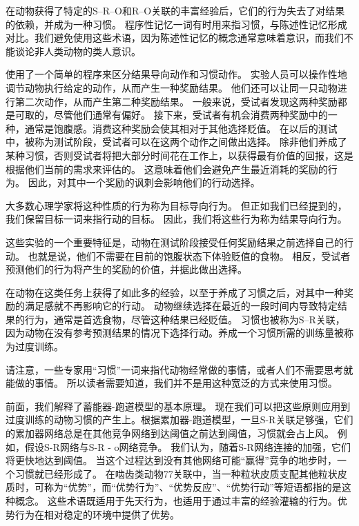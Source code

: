 在动物获得了特定的S–R–O和R–O关联的丰富经验后，它们的行为失去了对结果的依赖，并成为一种习惯。
程序性记忆一词有时用来指习惯，与陈述性记忆形成对比。我们避免使用这些术语，因为陈述性记忆的概念通常意味着意识，而我们不能谈论非人类动物的类人意识。\par


\cite{Balleine et al.2003}使用了一个简单的程序来区分结果导向动作和习惯动作。
实验人员可以操作性地调节动物执行给定的动作，从而产生一种奖励结果。
他们还可以让同一只动物进行第二次动作，从而产生第二种奖励结果。
一般来说，受试者发现这两种奖励都是可取的，尽管他们通常有偏好。
接下来，受试者有机会消费两种奖励中的一种，通常是饱腹感。消费这种奖励会使其相对于其他选择贬值。
在以后的测试中，被称为测试阶段，受试者可以在这两个动作之间做出选择。
除非他们养成了某种习惯，否则受试者将把大部分时间花在工作上，以获得最有价值的回报，这是根据他们当前的需求来评估的。
这意味着他们会避免产生最近消耗的奖励的行为。
因此，对其中一个奖励的讽刺会影响他们的行动选择。\par


大多数心理学家将这种性质的行为称为目标导向行为。
但正如我们已经提到的，我们保留目标一词来指行动的目标。
因此，我们将这些行为称为结果导向行为。\par


这些实验的一个重要特征是，动物在测试阶段接受任何奖励结果之前选择自己的行动。
也就是说，他们不需要在目前的饱腹状态下体验贬值的食物。
相反，受试者预测他们的行为将产生的奖励的价值，并据此做出选择。\par


在动物在这类任务上获得了如此多的经验，以至于养成了习惯之后，对其中一种奖励的满足感就不再影响它的行动。
动物继续选择在最近的一段时间内导致特定结果的行为，通常是首选食物，尽管这种结果已经贬值。
习惯也被称为S–R关联，因为动物在没有参考预测结果的情况下选择行动。养成一个习惯所需的训练量被称为过度训练。\par


请注意，一些专家用“习惯”一词来指代动物经常做的事情，或者人们不需要思考就能做的事情。
所以读者需要知道，我们并不是用这种宽泛的方式来使用习惯。\par


前面，我们解释了蓄能器-跑道模型的基本原理。
现在我们可以把这些原则应用到过度训练的动物习惯的产生上。根据累加器-跑道模型，一旦S-R关联足够强，它们的累加器网络总是在其他竞争网络到达阈值之前达到阈值，习惯就会占上风。
例如，假设S-R网络与S-R - o网络竞争。
我们认为，随着S-R网络连接的加强，它们将更快地达到阈值。
当这个过程达到没有其他网络可能“赢得”竞争的地步时，一个习惯就已经形成了。
在啮齿类动物77关联中，当一种粒状皮质支配其他粒状皮质时，可称为“优势”，而“优势行为”、“优势反应”、“优势行动”等短语都指的是这种概念。
这些术语既适用于先天行为，也适用于通过丰富的经验灌输的行为。优势行为在相对稳定的环境中提供了优势。\par


